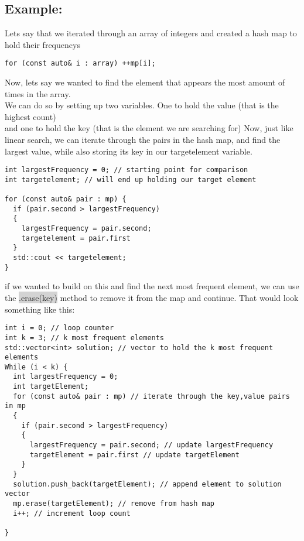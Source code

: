 \documentclass{report}
\begin{document}
\subsection{Example:}
Lets say that we iterated through an array of integers and created a hash map to hold their frequencys
\begin{verbatim}
for (const auto& i : array) ++mp[i];
\end{verbatim}
Now, lets say we wanted to find the element that appears the most amount of times in the array. \\ We can do so by setting up two variables. One to hold the value (that is the highest count) \\ and one to hold the key (that is the element we are searching for)
\bigbreak \noindent
Now, just like linear search, we can iterate through the pairs in the hash map, and find the largest value, while also storing its key in our targetelement variable.
\begin{mdframed}
\begin{verbatim}
int largestFrequency = 0; // starting point for comparison
int targetelement; // will end up holding our target element

for (const auto& pair : mp) {
  if (pair.second > largestFrequency)
  {
    largestFrequency = pair.second;
    targetelement = pair.first
  }
  std::cout << targetelement;
}
\end{verbatim}
\end{mdframed}
if we wanted to build on this and find the next most frequent element, we can use the \colorbox{lightgray}{.erase(key)} method to remove it from the map and continue. 
\bigbreak \noindent
That would look something like this:
\begin{mdframed}
\begin{verbatim}
int i = 0; // loop counter
int k = 3; // k most frequent elements
std::vector<int> solution; // vector to hold the k most frequent elements
While (i < k) {
  int largestFrequency = 0;
  int targetElement;
  for (const auto& pair : mp) // iterate through the key,value pairs in mp
  {
    if (pair.second > largestFrequency)
    {
      largestFrequency = pair.second; // update largestFrequency 
      targetElement = pair.first // update targetElement
    }
  }
  solution.push_back(targetElement); // append element to solution vector
  mp.erase(targetElement); // remove from hash map
  i++; // increment loop count

}
\end{verbatim}
\end{mdframed}
\end{document}
